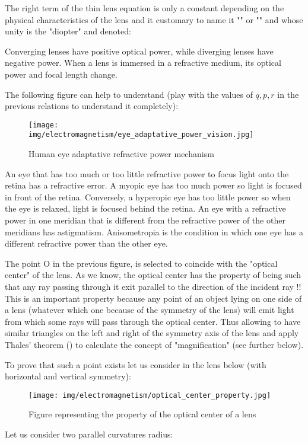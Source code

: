 	The right term of the thin lens equation is only a constant depending on the physical characteristics of the lens and it customary to name it "" or "" and whose unity is the "diopter" and denoted:
	
	Converging lenses have positive optical power, while diverging lenses have negative power. When a lens is immersed in a refractive medium, its optical power and focal length change.
	
	The following figure can help to understand (play with the values of $q,p,r$ in the previous relations to understand it completely):
	\begin{figure}[H]
		\centering
		\texttt{[image: img/electromagnetism/eye\_adaptative\_power\_vision.jpg]}
		\caption{Human eye adaptative refractive power mechanism}
	\end{figure}
	\begin{tcolorbox}[title=Remark,colframe=black,arc=10pt]
	An eye that has too much or too little refractive power to focus light onto the retina has a refractive error. A myopic eye has too much power so light is focused in front of the retina. Conversely, a hyperopic eye has too little power so when the eye is relaxed, light is focused behind the retina. An eye with a refractive power in one meridian that is different from the refractive power of the other meridians has astigmatism. Anisometropia is the condition in which one eye has a different refractive power than the other eye.
	\end{tcolorbox}
	The point O in the previous figure, is selected to coincide with the "optical center" of the lens. As we know, the optical center has the property of being such that any ray passing through it exit parallel to the direction of the incident ray !! This is an important property because any point of an object lying on one side of a lens (whatever which one because of the symmetry of the lens) will emit light from which some rays will pass through the optical center. Thus allowing to have similar triangles on the left and right of the symmetry axis of the lens and apply Thales' theorem () to calculate the concept of "magnification" (see further below).

	To prove that such a point exists let us consider in the lens below (with horizontal and vertical symmetry):
	\begin{figure}[H]
		\centering
		\texttt{[image: img/electromagnetism/optical\_center\_property.jpg]}
		\caption[]{Figure representing the property of the optical center of a lens}
	\end{figure}
	 Let us consider two parallel curvatures radius:
	

